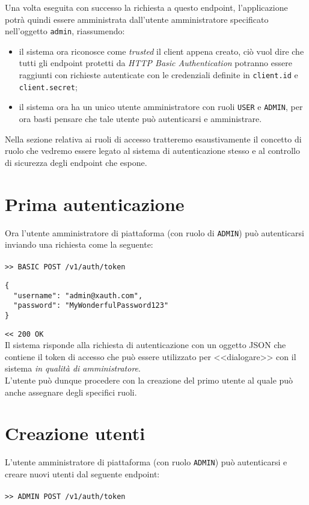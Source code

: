 \documentclass[a4paper,12pt]{article}
\begin{document}
Una volta eseguita con successo la richiesta a questo endpoint, 
l'applicazione potrà quindi essere amministrata dall'utente amministratore specificato nell'oggetto \texttt{admin}, riassumendo:
\begin{itemize}
	\item il sistema ora riconosce come \textit{trusted} il client appena creato, ciò vuol dire che tutti gli endpoint protetti da \textit{HTTP Basic Authentication} potranno essere raggiunti con richieste autenticate con le credenziali definite in \texttt{client.id} e \texttt{client.secret};
	\item il sistema ora ha un unico utente amministratore con ruoli \texttt{USER} e \texttt{ADMIN}, per ora basti pensare che tale utente può autenticarsi e amministrare. 
\end{itemize}

Nella sezione relativa ai ruoli di accesso tratteremo esaustivamente il concetto di ruolo che vedremo essere legato al sistema di autenticazione stesso e al controllo di sicurezza degli endpoint che espone.

\section{Prima autenticazione}
\label{stauth}
Ora l'utente amministratore di piattaforma (con ruolo di \texttt{ADMIN}) può autenticarsi inviando una richiesta come la seguente: \\
\\
\texttt{>> BASIC POST /v1/auth/token}

\begin{lstlisting}
{
  "username": "admin@xauth.com",
  "password": "MyWonderfulPassword123"
}
\end{lstlisting}
\texttt{<< 200 OK} \\

Il sistema risponde alla richiesta di autenticazione con un oggetto JSON che contiene il token di accesso che può essere utilizzato per <<dialogare>> con il sistema \textit{in qualità di amministratore}.\\

L'utente può dunque procedere con la creazione del primo utente al quale può anche assegnare degli specifici ruoli.

\section{Creazione utenti}
\label{mkusr}
L'utente amministratore di piattaforma (con ruolo \texttt{ADMIN}) può autenticarsi e creare nuovi utenti dal seguente endpoint: \\
\\
\texttt{>> ADMIN POST /v1/auth/token}
\end{document}
